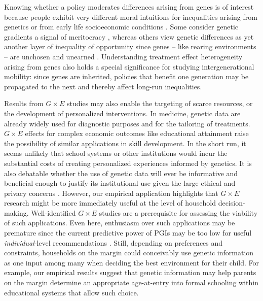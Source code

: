 \documentclass[12pt,a4paper]{article}
\begin{document}
\begin{bibunit}
Knowing whether a policy moderates differences arising from genes is of interest because people exhibit very different moral intuitions for inequalities arising from genetics or from early life socioeconomic conditions \citep[e.g.,][]{sandel2020tyranny,harden2021genetic}.   Some consider genetic gradients a signal of meritocracy \citep[e.g.,][]{Rimfeld2018}, whereas others view genetic differences as yet another layer of inequality of opportunity since genes -- like rearing environments -- are unchosen and unearned \citep[e.g.,][]{harden2021genetic, kweon2020genetic}. Understanding treatment effect heterogeneity arising from genes also holds a special significance for studying intergenerational mobility:  since genes are inherited, policies that benefit one generation may be propagated to the next and thereby affect long-run inequalities.

Results from $G\times{}E$ studies may also enable the targeting of scarce resources, or the development of personalized interventions.  In medicine, genetic data are already widely used for diagnostic purposes and for the tailoring of treatments.  $G \times E$ effects for complex economic outcomes like educational attainment raise the possibility of similar applications in skill development.  In the short run, it seems unlikely that school systems or other institutions would incur the substantial costs of creating personalized experiences informed by genetics. It is also debatable whether the use of genetic data will ever be informative and beneficial enough to justify its institutional use given the large ethical and privacy concerns \citep{meyer2023wrestling}. However, our empirical application highlights that $G \times E$ research might be more immediately useful at the level of household decision-making. Well-identified $G\times{}E$ studies are a prerequisite for assessing the viability of such applications. Even here, enthusiasm over such applications may be premature since the current predictive power of PGIs may be too low for useful \textit{individual}-level recommendations \citep{morris2020can,Turley2021embryo}. Still, depending on preferences and constraints, households on the margin could conceivably use genetic information as one input among many when deciding the best environment for their child. For example, our empirical results suggest that genetic information may help parents on the margin determine an appropriate age-at-entry into formal schooling within educational systems that allow such choice.    


\end{bibunit}
\end{document}
